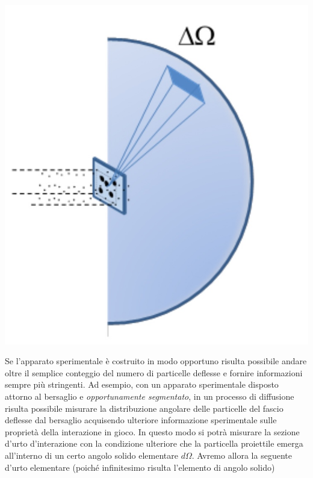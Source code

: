 \begin{marginfigure}
	\includegraphics{figs/solid-angle-cross-section}
	\label{fig:solid-angle-cross-section}
\end{marginfigure}

Se l'apparato sperimentale è costruito in modo opportuno risulta
possibile andare oltre il semplice conteggio del numero di particelle
deflesse e fornire informazioni sempre più stringenti.
Ad esempio, con
un apparato sperimentale disposto attorno al bersaglio e
\emph{opportunamente segmentato}, in un processo di diffusione risulta
possibile misurare la distribuzione angolare delle particelle del fascio
deflesse dal bersaglio acquisendo ulteriore informazione sperimentale
sulle proprietà della interazione in gioco.
In questo modo si potrà
misurare la sezione d'urto d'interazione con la condizione ulteriore che
la particella proiettile emerga all'interno di un certo angolo solido
elementare \(d \Omega\).
Avremo allora la seguente d'urto elementare
(poiché infinitesimo risulta l'elemento di angolo solido)



